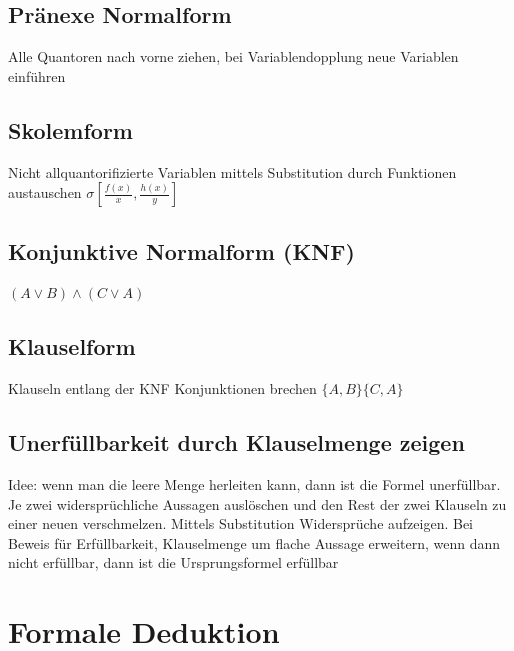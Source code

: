 \documentclass[a4paper]{article}
\begin{document}
		\subsection{Pränexe Normalform}
			Alle Quantoren nach vorne ziehen, bei Variablendopplung neue Variablen einführen
		\subsection{Skolemform}
			Nicht allquantorifizierte Variablen mittels Substitution durch Funktionen austauschen 
			$\sigma[\frac{f(x)}{x}, \frac{h(x)}{y}]$
		\subsection{Konjunktive Normalform (KNF)}
			$(A\lor B)\land (C \lor A)$	
		\subsection{Klauselform}
			Klauseln entlang der KNF Konjunktionen brechen \newline
			$\{A, B\}\{C, A\}$
		\subsection{Unerfüllbarkeit durch Klauselmenge zeigen}
			Idee: wenn man die leere Menge herleiten kann, dann ist die Formel unerfüllbar. \newline
			Je zwei widersprüchliche Aussagen auslöschen und den Rest der zwei Klauseln zu einer neuen verschmelzen. Mittels Substitution Widersprüche aufzeigen. \newline
			Bei Beweis für Erfüllbarkeit, Klauselmenge um flache Aussage erweitern, wenn dann nicht erfüllbar, dann ist die Ursprungsformel erfüllbar
	\section{Formale Deduktion}
\end{document}
